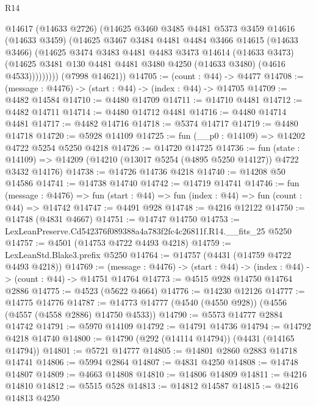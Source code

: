 \begin{lexlean}{R14}
\begin{coremodule}
              @14617
              (@14633 @2726)
              (@14625
                @3460
                @3485
                @4481
                @5373
                @3459
                @14616
                (@14633 @3459)
                (@14625
                  @3467
                  @3484
                  @4481
                  @4484
                  @3466
                  @14615
                  (@14633 @3466)
                  (@14625
                    @3474
                    @3483
                    @4481
                    @4483
                    @3473
                    @14614
                    (@14633 @3473)
                    (@14625 @3481 @130 @4481 @4481 @3480 @4250 (@14633 @3480) (@4616 @4533)))))))))
      (@7998 @14621))
@14705 := (count : @44) -> @4477
@14708 := (message : @4476) -> (start : @44) -> (index : @44) -> @14705
@14709 := @4482 @14584
@14710 := @4480 @14709
@14711 := @14710 @4481
@14712 := @4482 @14711
@14714 := @4480 @14712 @4481
@14716 := @4480 @14714 @4481
@14717 := @4482 @14716
@14718 := @5374 @14717
@14719 := @4480 @14718
@14720 := @5928 @14109
@14725 := fun (__p0 : @14109) => @14202 @4722 @5254 @5250 @4218
@14726 := @14720 @14725
@14736 := fun (state : @14109) =>
  @14209 (@14210 (@13017 @5254 (@4895 @5250 @14127)) @4722 @3432 @14176)
@14738 := @14726 @14736 @4218
@14740 := @14208 @50 @14586
@14741 := @14738 @14740
@14742 := @14719 @14741
@14746 := fun (message : @4476) =>
  fun (start : @44) => fun (index : @44) => fun (count : @44) => @14742
@14747 := @4491 @928
@14748 := @4216 @12122
@14750 := @14748 (@4831 @4667)
@14751 := @14747 @14750
@14753 := LexLeanPreserve.Cd542376f089388a4a783f2fc4c26811f.R14.__fits_25 @5250
@14757 := @4501 (@14753 @4722 @4493 @4218)
@14759 := LexLeanStd.Blake3.prefix @5250
@14764 := @14757 (@4431 (@14759 @4722 @4493 @4218))
@14769 := (message : @4476) -> (start : @44) -> (index : @44) -> (count : @44) -> @14751 @14764
@14773 := @4515 @928 @14750 @14764 @2886
@14775 := @4523 (@5622 @4664)
@14776 := @14230 @12126
@14777 := @14775 @14776
@14787 := @14773 @14777 (@4540 (@4550 @928)) (@4556 (@4557 (@4558 @2886) @14750 @4533))
@14790 := @5573 @14777 @2884 @14742
@14791 := @5970 @14109
@14792 := @14791 @14736
@14794 := @14792 @4218 @14740
@14800 := @14790 (@292 (@14114 @14794)) (@4431 (@14165 @14794))
@14801 := @5721 @14777
@14805 := @14801 @2860 @2883 @14718 @14741
@14806 := @5994 @2864
@14807 := @4831 @4250
@14808 := @14748 @14807
@14809 := @4663 @14808
@14810 := @14806 @14809
@14811 := @4216 @14810
@14812 := @5515 @528
@14813 := @14812 @14587
@14815 := @4216 @14813 @4250

\end{coremodule}
\end{lexlean}
